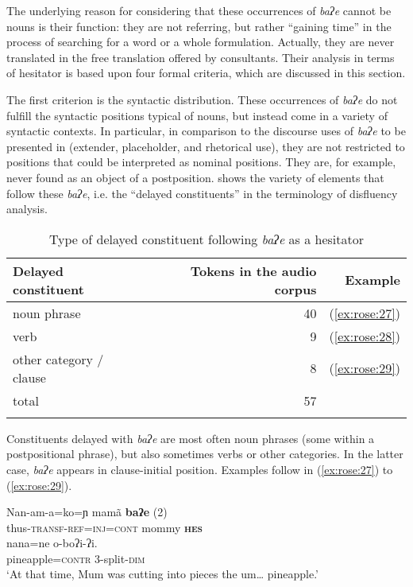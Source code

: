 \documentclass[output=paper]{langscibook}
\begin{document}
The underlying reason for considering that these occurrences of \textit{baʔe} cannot be nouns is their function: they are not referring, but rather “gaining time” in the process of searching for a word or a whole formulation. Actually, they are never translated in the free translation offered by consultants. Their analysis in terms of hesitator is based upon four formal criteria, which are discussed in this section.

The first criterion is the syntactic distribution.  These occurrences of  \textit{baʔe} do not fulfill the syntactic positions typical of nouns, but instead come in a variety of syntactic contexts. In particular, in comparison to the discourse uses of \textit{baʔe} to be presented in  (extender, placeholder, and rhetorical use), they are not restricted to positions that could be interpreted as nominal positions. They are, for example, never found as an object of a postposition.  shows the variety of elements that follow these \textit{baʔe}, i.e. the “delayed constituents” in the terminology of disfluency analysis.

\begin{table}
\begin{tabular}{lrr}
\lsptoprule
Delayed constituent & Tokens in the audio corpus & Example\\
\midrule
noun phrase & 40 & (\ref{ex:rose:27})\\
verb & 9 & (\ref{ex:rose:28})\\
other category / clause & 8 & (\ref{ex:rose:29})\\
total & 57 & \\
\lspbottomrule
\end{tabular}
\caption{\label{tab:rose:3}Type of delayed constituent following \textit{baʔe} as a hesitator}
\end{table}

Constituents delayed with \textit{baʔe} are most often noun phrases (some within a  postpositional phrase), but also sometimes verbs or other categories. In the latter case, \textit{baʔe} appears in clause-initial position. Examples follow in (\ref{ex:rose:27}) to (\ref{ex:rose:29}).

\newpage
\ea \label{ex:rose:27}
\gll Nan-am-a=ko=ɲ  mamã  \textbf{baʔe} (2)  \\
thus-\textsc{transf}{}-\textsc{ref}=\textsc{inj=cont}  mommy  \textbf{\textsc{hes}}\\
\gll nana=ne  o-boʔi-ʔi.\\
pineapple=\textsc{contr}  3-split-\textsc{dim}\\
\glt ‘At that time, Mum was cutting into pieces the um… pineapple.’ 
\z 
\end{document}

